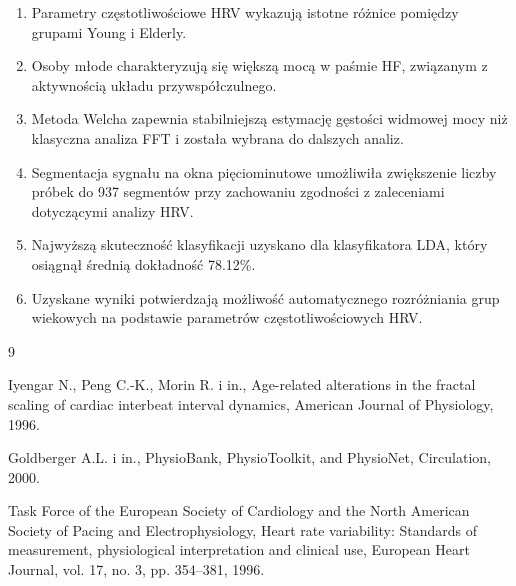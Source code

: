 \documentclass[a4paper,12pt]{article}
\begin{document}
\begin{enumerate}
    \item Parametry częstotliwościowe HRV wykazują istotne różnice pomiędzy grupami Young i Elderly.
    
    \item Osoby młode charakteryzują się większą mocą w paśmie HF, związanym z aktywnością układu przywspółczulnego.
    
    \item Metoda Welcha zapewnia stabilniejszą estymację gęstości widmowej mocy niż klasyczna analiza FFT i została wybrana do dalszych analiz.
    
    \item Segmentacja sygnału na okna pięciominutowe umożliwiła zwiększenie liczby próbek do 937 segmentów przy zachowaniu zgodności z zaleceniami dotyczącymi analizy HRV.
    
    \item Najwyższą skuteczność klasyfikacji uzyskano dla klasyfikatora LDA, który osiągnął średnią dokładność 78.12\%.
    
    \item Uzyskane wyniki potwierdzają możliwość automatycznego rozróżniania grup wiekowych na podstawie parametrów częstotliwościowych HRV.
\end{enumerate}


\begin{thebibliography}{9}

Iyengar N., Peng C.-K., Morin R. i in.,
Age-related alterations in the fractal scaling of cardiac interbeat interval dynamics,
American Journal of Physiology, 1996.

Goldberger A.L. i in.,
PhysioBank, PhysioToolkit, and PhysioNet,
Circulation, 2000.

Task Force of the European Society of Cardiology and
the North American Society of Pacing and Electrophysiology,
Heart rate variability: Standards of measurement,
physiological interpretation and clinical use,
European Heart Journal,
vol. 17, no. 3, pp. 354--381, 1996.

\end{thebibliography}

\end{document}
